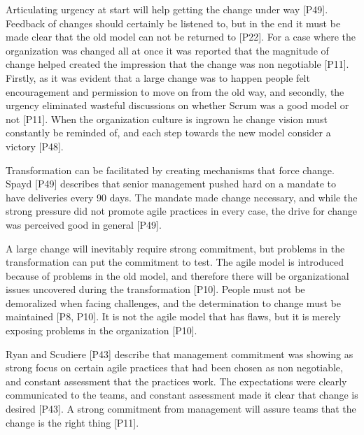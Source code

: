 \documentclass[preprint,authoryear,12pt]{elsarticle}
\begin{document}

Articulating urgency at start will help getting the change under way [P49].
Feedback of changes should certainly be listened to, but in the end it must be
made clear that the old model can not be returned to [P22].
For a case where the organization was changed all at once it was reported that
the magnitude of change helped created the impression that the change was non
negotiable [P11]. Firstly, as it was evident that a large change was to happen
people felt encouragement and permission to move on from the old way, and
secondly, the urgency eliminated wasteful discussions on whether Scrum was a
good model or not [P11].
When the organization culture is ingrown he change vision must constantly be
reminded of, and each step towards the new model consider a victory [P48].


Transformation can be facilitated by creating mechanisms that force change.
Spayd [P49] describes that senior management pushed hard on a mandate to have
deliveries every 90 days. The mandate made change necessary, and while the
strong pressure did not promote agile practices in every case, the drive for
change was perceived good in general [P49].


A large change will inevitably require strong commitment, but problems in the
transformation can put the commitment to test. The agile model is introduced
because of problems in the old model, and therefore there will be organizational
issues uncovered during the transformation [P10]. People must not be demoralized
when facing challenges, and the determination to change must be maintained [P8,
P10]. It is not the agile model that has flaws, but it is merely exposing
problems in the organization [P10].

Ryan and Scudiere [P43] describe that management commitment was showing as
strong focus on certain agile practices that had been chosen as non negotiable,
and constant assessment that the practices work. The expectations were clearly
communicated to the teams, and constant assessment made it clear that change is
desired [P43].
A strong commitment from management will assure teams that the change is the
right thing [P11].

\end{document}
